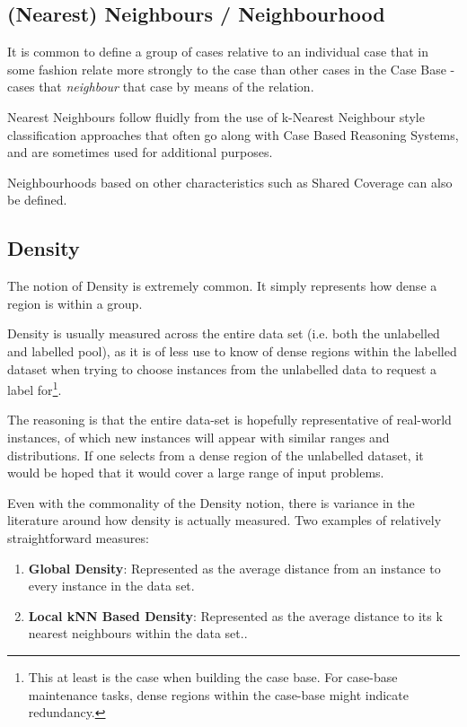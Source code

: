 \documentclass[a4paper,11pt]{report}
\begin{document}
\subsection{(Nearest) Neighbours / Neighbourhood}
It is common to define a group of cases relative to an individual case that in some fashion relate more strongly to the case than other cases in the Case Base - cases that \emph{neighbour} that case by means of the relation.

Nearest Neighbours follow fluidly from the use of k-Nearest Neighbour style classification approaches that often go along with Case Based Reasoning Systems, and are sometimes used for additional purposes.

Neighbourhoods based on other characteristics such as Shared Coverage can also be defined.

\subsection{Density}
The notion of Density is extremely common. It simply represents how dense a region is within a group.

Density is usually measured across the entire data set (i.e. both the unlabelled and labelled pool), as it is of less use to know of dense regions within the labelled dataset when trying to choose instances from the unlabelled data to request a label for\footnote{This at least is the case when building the case base. For case-base maintenance tasks, dense regions within the case-base might indicate redundancy.}. 

The reasoning is that the entire data-set is hopefully representative of real-world instances, of which new instances will appear with similar ranges and distributions. If one selects from a dense region of the unlabelled dataset, it would be hoped that it would cover a large range of input problems.

Even with the commonality of the Density notion, there is variance in the literature around how density is actually measured. Two examples of relatively straightforward measures:
\begin{enumerate}
	\item \textbf{Global Density}: Represented as the average distance from an instance to every  instance in the data set\cite{Xu2007}.
	\item \textbf{Local kNN Based Density}: Represented as the average distance to its k nearest neighbours within the data set.\cite{Zhu2008}.
\end{enumerate}
\end{document}
